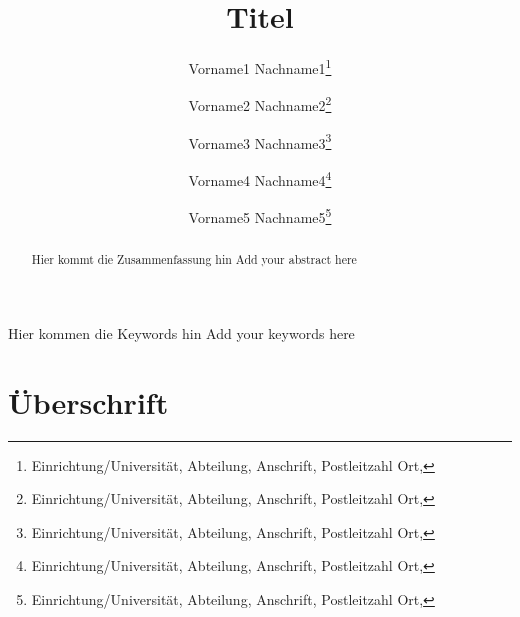 \documentclass[]{lni}
\begin{document}
\author[Vorname1 Name1\and Vorname2 Name2\and Vorname3 Name3\and Vorname4 Name4\and Vorname5 Name5\and Vorname6 Name6]
{
 Vorname1 Nachname1\footnote{Einrichtung/Universität, Abteilung, Anschrift, Postleitzahl Ort, }\and
 Vorname2 Nachname2\footnote{Einrichtung/Universität, Abteilung, Anschrift, Postleitzahl Ort, }\and
 Vorname3 Nachname3\footnote{Einrichtung/Universität, Abteilung, Anschrift, Postleitzahl Ort, }\and
 Vorname4 Nachname4\footnote{Einrichtung/Universität, Abteilung, Anschrift, Postleitzahl Ort, }\and
 Vorname5 Nachname5\footnote{Einrichtung/Universität, Abteilung, Anschrift, Postleitzahl Ort, }
}
\title[Kurztitel (falls nötig)]{Titel}
\maketitle

\begin{abstract}
Hier kommt die Zusammenfassung hin
Add your abstract here
\end{abstract}
\begin{keywords}
Hier kommen die Keywords hin
Add your keywords here
\end{keywords}

\clearpage
\section{Überschrift}


\end{document}
